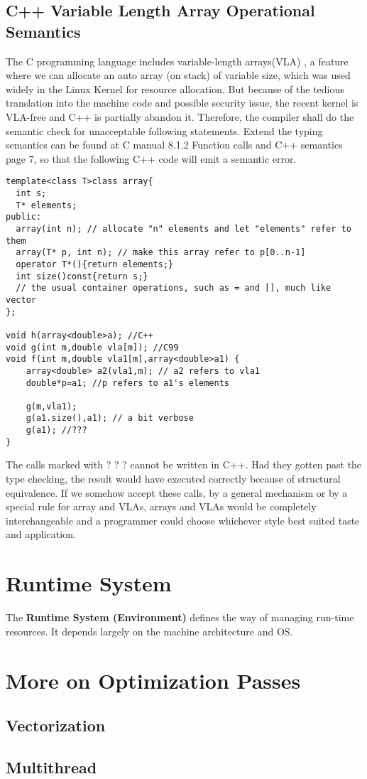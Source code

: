 \documentclass[a4paper]{exam}
\theoremstyle{definition}
\begin{document}
\subsection{C++ Variable Length Array Operational Semantics}
The C programming language\cite{openstd} includes variable-length arrays(VLA) \cite{makinglessdangerous}, a feature where we can allocate an auto array (on stack) of variable size, which was used widely in the Linux Kernel for resource allocation. But because of the tedious translation into the machine code and possible security issue, the recent kernel is VLA-free and C++ is partially abandon it. Therefore, the compiler shall do the semantic check for unacceptable following statements. Extend the typing semantics can be found at C manual 8.1.2 Function calls\cite{cfuncall} and C++ semantics page 7\cite{cs230lec06}, so that the following C++ code will emit a semantic error.
\begin{verbatim}
template<class T>class array{ 
  int s;
  T* elements; 
public:
  array(int n); // allocate "n" elements and let "elements" refer to them 
  array(T* p, int n); // make this array refer to p[0..n-1]
  operator T*(){return elements;}
  int size()const{return s;} 
  // the usual container operations, such as = and [], much like vector 
};

void h(array<double>a); //C++
void g(int m,double vla[m]); //C99
void f(int m,double vla1[m],array<double>a1) {
    array<double> a2(vla1,m); // a2 refers to vla1 
    double*p=a1; //p refers to a1's elements

    g(m,vla1);
    g(a1.size(),a1); // a bit verbose 
    g(a1); //???
}
\end{verbatim}
The calls marked with ? ? ? cannot be written in C++. Had they gotten past the type checking, the result would have executed correctly because of structural equivalence. If we somehow accept these calls, by a general mechanism or by a special rule for array and VLAs, arrays and VLAs would be completely interchangeable and a programmer could choose whichever style best suited taste and application.
\subsubsection{}

\section{Runtime System}
The \textbf{Runtime System (Environment)} defines the way of managing run-time resources. It depends largely on the machine architecture and OS.


\section{More on Optimization Passes}
\subsection{Vectorization}

\subsection{Multithread}

\printbibliography
\end{document}
